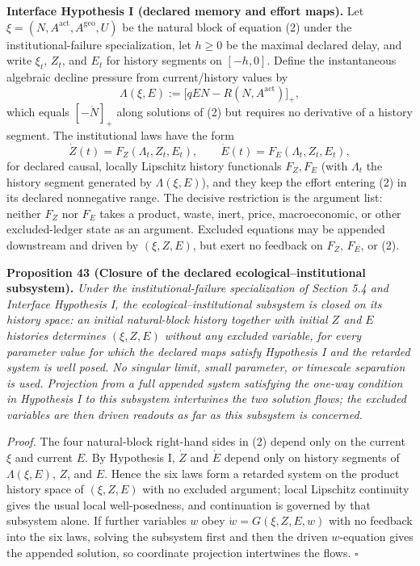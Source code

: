 \documentclass[11pt]{article}
\begin{document}
\textbf{Interface Hypothesis I (declared memory and effort maps).} Let \(\xi=(N,A^{\mathrm{act}},A^{\mathrm{geo}},U)\) be the natural block of equation (2) under the institutional-failure specialization, let \(h\ge0\) be the maximal declared delay, and write \(\xi_t\), \(Z_t\), and \(E_t\) for history segments on \([-h,0]\). Define the instantaneous algebraic decline pressure from current/history values by
$$\Lambda(\xi,E):=\bigl[qEN-R(N,A^{\mathrm{act}})\bigr]_+,$$
which equals \([-\dot N]_+\) along solutions of (2) but requires no derivative of a history segment. The institutional laws have the form
$$\dot Z(t)=F_Z(\Lambda_t,Z_t,E_t),\qquad \dot E(t)=F_E(\Lambda_t,Z_t,E_t),$$
for declared causal, locally Lipschitz history functionals \(F_Z,F_E\) (with \(\Lambda_t\) the history segment generated by \(\Lambda(\xi,E)\)), and they keep the effort entering (2) in its declared nonnegative range. The decisive restriction is the argument list: neither \(F_Z\) nor \(F_E\) takes a product, waste, inert, price, macroeconomic, or other excluded-ledger state as an argument. Excluded equations may be appended downstream and driven by \((\xi,Z,E)\), but exert no feedback on \(F_Z\), \(F_E\), or (2).

\textbf{Proposition 43 (Closure of the declared ecological--institutional subsystem).} \emph{Under the institutional-failure specialization of Section 5.4 and Interface Hypothesis I, the ecological--institutional subsystem is closed on its history space: an initial natural-block history together with initial \(Z\) and \(E\) histories determines \((\xi,Z,E)\) without any excluded variable, for every parameter value for which the declared maps satisfy Hypothesis I and the retarded system is well posed. No singular limit, small parameter, or timescale separation is used. Projection from a full appended system satisfying the one-way condition in Hypothesis I to this subsystem intertwines the two solution flows; the excluded variables are then driven readouts as far as this subsystem is concerned.}

\emph{Proof.} The four natural-block right-hand sides in (2) depend only on the current \(\xi\) and current \(E\). By Hypothesis I, \(\dot Z\) and \(\dot E\) depend only on history segments of \(\Lambda(\xi,E)\), \(Z\), and \(E\). Hence the six laws form a retarded system on the product history space of \((\xi,Z,E)\) with no excluded argument; local Lipschitz continuity gives the usual local well-posedness, and continuation is governed by that subsystem alone. If further variables \(w\) obey \(\dot w=G(\xi,Z,E,w)\) with no feedback into the six laws, solving the subsystem first and then the driven \(w\)-equation gives the appended solution, so coordinate projection intertwines the flows. \(\square\)
\end{document}
